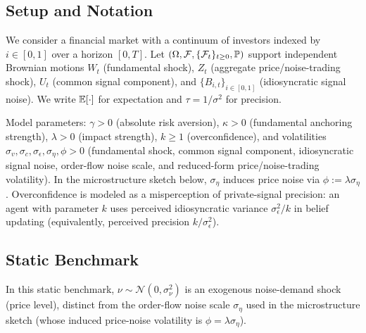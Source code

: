 
\subsection{Setup and Notation}

We consider a financial market with a continuum of investors indexed by $i \in [0,1]$ over a horizon $[0,T]$. Let $(\Omega,\mathcal{F},\{\mathcal{F}_t\}_{t\ge 0},\mathbb{P})$ support independent Brownian motions $W_t$ (fundamental shock), $Z_t$ (aggregate price/noise-trading shock), $U_t$ (common signal component), and $\{B_{i,t}\}_{i\in[0,1]}$ (idiosyncratic signal noise). We write $\mathbb{E}[\cdot]$ for expectation and $\tau = 1/\sigma^2$ for precision.

Model parameters: $\gamma>0$ (absolute risk aversion), $\kappa>0$ (fundamental anchoring strength), $\lambda>0$ (impact strength), $k\ge 1$ (overconfidence), and volatilities $\sigma_v,\sigma_c,\sigma_\epsilon,\sigma_\eta,\phi>0$ (fundamental shock, common signal component, idiosyncratic signal noise, order-flow noise scale, and reduced-form price/noise-trading volatility). In the microstructure sketch below, $\sigma_\eta$ induces price noise via $\phi:=\lambda\sigma_\eta$. Overconfidence is modeled as a misperception of private-signal precision: an agent with parameter $k$ uses perceived idiosyncratic variance $\sigma_\epsilon^2/k$ in belief updating (equivalently, perceived precision $k/\sigma_\epsilon^2$).

\subsection{Static Benchmark}

In this static benchmark, $\nu\sim \mathcal{N}(0,\sigma_\nu^2)$ is an exogenous noise-demand shock (price level), distinct from the order-flow noise scale $\sigma_\eta$ used in the microstructure sketch (whose induced price-noise volatility is $\phi=\lambda\sigma_\eta$).

